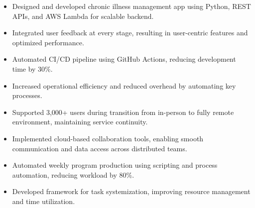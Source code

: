 \par\smallskip
\begin{minipage}{13.75cm}
  \begin{minipage}{6.5cm}
    \begin{itemize}
      \item Designed and developed chronic illness management app using Python, REST APIs, and AWS Lambda for scalable backend.
      \item Integrated user feedback at every stage, resulting in user-centric features and optimized performance.
    \end{itemize}
  \end{minipage}
  \hfill
  \begin{minipage}{6.5cm}
    \begin{itemize}
      \item Automated CI/CD pipeline using GitHub Actions, reducing development time by 30\%.
      \item Increased operational efficiency and reduced overhead by automating key processes.
    \end{itemize}
  \end{minipage}
\end{minipage}
\par\smallskip
\divider

\par\smallskip
\begin{minipage}{13.75cm}
  \begin{minipage}{6.5cm}
    \begin{itemize}
      \item Supported 3,000+ users during transition from in-person to fully remote environment, maintaining service continuity.
      \item Implemented cloud-based collaboration tools, enabling smooth communication and data access across distributed teams.
    \end{itemize}
  \end{minipage}
  \hfill
  \begin{minipage}{6.5cm}
    \begin{itemize}
      \item Automated weekly program production using scripting and process automation, reducing workload by 80\%.
      \item Developed framework for task systemization, improving resource management and time utilization.
    \end{itemize}
  \end{minipage}
\end{minipage}

